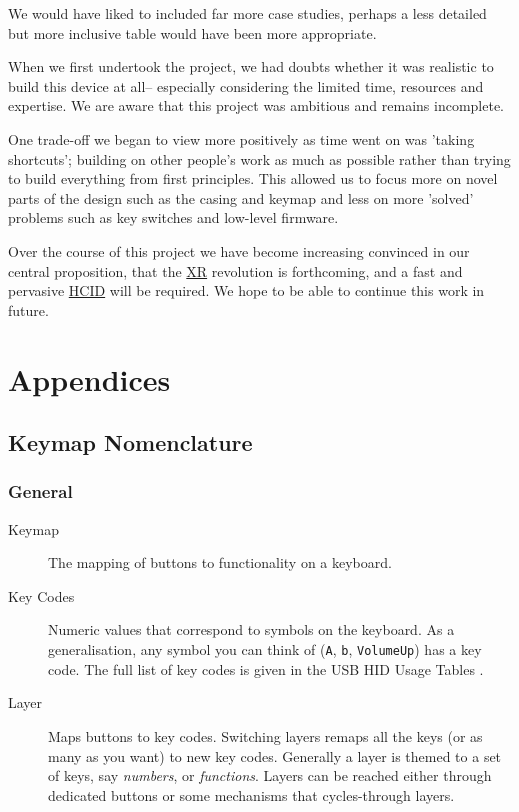 \documentclass[logo,bsc,singlespacing,parskip]{infthesis}
\begin{document}
We would have liked to included far more case studies, perhaps a less detailed but more inclusive table would have been more appropriate.

When we first undertook the project, we had doubts whether it was realistic to build this device at all-- especially considering the limited time, resources and expertise.
We are aware that this project was ambitious and remains incomplete.

One trade-off we began to view more positively as time went on was 'taking shortcuts'; building on other people's work as much as possible rather than trying to build everything from first principles.
This allowed us to focus more on novel parts of the design such as the casing and keymap and less on more 'solved' problems such as key switches and low-level firmware.

Over the course of this project we have become increasing convinced in our central proposition, that the \hyperref[org53dbe83]{XR} revolution is forthcoming, and a fast and pervasive \hyperref[org917851e]{HCID} will be required.
We hope to be able to continue this work in future.

\printbibliography
{}
\part{Appendices}
\label{sec:orgcd61e08}
\appendix
\chapter{Keymap Nomenclature}
\label{sec:org004bc1b}
\section{General}
\label{sec:orge39b7d2}
\begin{mdframed}
\begin{description}
\item[{Keymap}] The mapping of buttons to functionality on a keyboard.
\item[{Key Codes}] Numeric values that correspond to symbols on the keyboard.
As a generalisation, any symbol you can think of (\texttt{A}, \texttt{b}, \texttt{VolumeUp}) has a key code.
The full list of key codes is given in the USB HID Usage Tables \autocite{mcgowanUniversalSerialBus2004}.
\item[{Layer}] Maps buttons to key codes.
Switching layers remaps all the keys (or as many as you want) to new key codes.
Generally a layer is themed to a set of keys, say \emph{numbers}, or \emph{functions}.
Layers can be reached either through dedicated buttons or some mechanisms that cycles-through layers.
\end{description}
\end{mdframed}
\end{document}
